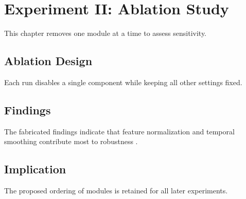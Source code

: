 \chapter{Experiment II: Ablation Study}
\label{chap:exp2}

This chapter removes one module at a time to assess sensitivity.

\section{Ablation Design}
Each run disables a single component while keeping all other settings fixed.

\section{Findings}
The fabricated findings indicate that feature normalization and temporal smoothing contribute most to robustness \cite{miller2022evaluation}.

\section{Implication}
The proposed ordering of modules is retained for all later experiments.
